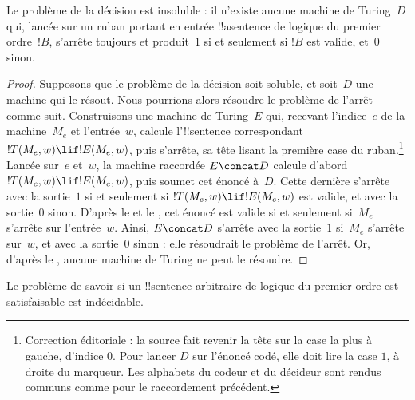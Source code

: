 \documentclass[../../../include/open-logic-section]{subfiles}
\begin{document}

\begin{thm}
Le problème de la décision est insoluble : il n'existe aucune machine
de Turing~$D$ qui, lancée sur un ruban portant en entrée
!!a{sentence} de logique du premier ordre~$!B$, s'arrête toujours
et produit~$1$ si et seulement si $!B$ est valide, et~$0$ sinon.
\end{thm}

\begin{proof}
Supposons que le problème de la décision soit soluble, et soit~$D$
une machine qui le résout. Nous pourrions alors résoudre le problème
de l'arrêt comme suit. Construisons une machine de Turing~$E$ qui,
recevant l'indice~$e$ de la machine~$M_e$ et l'entrée~$w$, calcule
l'!!{sentence} correspondant $!T(M_e,w) \lif !E(M_e,w)$, puis s'arrête,
sa tête lisant la première case du ruban.\footnote{Correction éditoriale : la source fait revenir la tête sur la case la plus à gauche, d'indice $0$. Pour lancer $D$ sur l'énoncé codé, elle doit lire la case $1$, à droite du marqueur. Les alphabets du codeur et du décideur sont rendus communs comme pour le raccordement précédent.} Lancée sur~$e$ et~$w$,
la machine raccordée $E \concat D$ calcule d'abord
$!T(M_e,w) \lif !E(M_e,w)$, puis soumet cet énoncé à~$D$.
Cette dernière s'arrête avec la sortie~$1$ si et seulement si
$!T(M_e,w) \lif !E(M_e,w)$ est valide, et avec la sortie~$0$
sinon. D'après le  et
le , cet énoncé est valide si et seulement
si~$M_e$ s'arrête sur l'entrée~$w$. Ainsi, $E \concat D$ s'arrête
avec la sortie~$1$ si~$M_e$ s'arrête sur~$w$, et avec la sortie~$0$
sinon : elle résoudrait le problème de l'arrêt. Or, d'après
le , aucune machine de Turing ne peut
le résoudre.
\end{proof}

\begin{cor}%
Le problème de savoir si un !!{sentence} arbitraire de logique du
premier ordre est satisfaisable est indécidable.
\end{cor}
\end{document}
